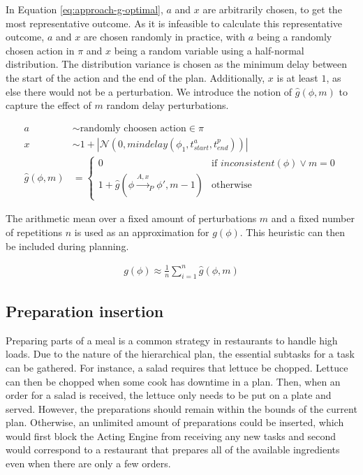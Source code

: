 In Equation \ref{eq:approach-g-optimal}, $a$ and $x$ are arbitrarily chosen, to get the most representative outcome.
As it is infeasible to calculate this representative outcome, $a$ and $x$ are chosen randomly in practice, with $a$ being a randomly chosen action in $\pi$ and $x$ being a random variable using a half-normal distribution.
The distribution variance is chosen as the minimum delay between the start of the action and the end of the plan.
Additionally, $x$ is at least $1$, as else there would not be a perturbation.
We introduce the notion of $\hat{g}(\phi,m)$ to capture the effect of $m$ random delay perturbations.

\begin{align}
    a &\sim \text{randomly choosen action} \in \pi\\
    x &\sim  1 + |\mathcal{N}(0,mindelay(\phi_1,t^a_{start},t^p_{end}))| \\
    \hat{g}(\phi,m) &= \begin{cases}
        0 &\text{if } inconsistent(\phi) \lor m = 0 \\
        1 + \hat{g}(\phi \xrightarrow{A,x}_P \phi', m - 1) &\text{otherwise}
    \end{cases}
\end{align}

The arithmetic mean over a fixed amount of perturbations $m$ and a fixed number of repetitions $n$ is used as an approximation for $g(\phi)$.
This heuristic can then be included during planning.

\begin{align}
    g(\phi) \approx \frac{1}{n} \sum_{i=1}^{n} \hat{g}(\phi,m)
\end{align}

\subsection{Preparation insertion}
\label{sec:approach-preparation}

Preparing parts of a meal is a common strategy in restaurants to handle high loads.
Due to the nature of the hierarchical plan, the essential subtasks for a task can be gathered.
For instance, a salad requires that lettuce be chopped.  
Lettuce can then be chopped when some cook has downtime in a plan.
Then, when an order for a salad is received, the lettuce only needs to be put on a plate and served.
However, the preparations should remain within the bounds of the current plan.
Otherwise, an unlimited amount of preparations could be inserted, which would first block the Acting Engine from receiving any new tasks and second would correspond to a restaurant that prepares all of the available ingredients even when there are only a few orders.

